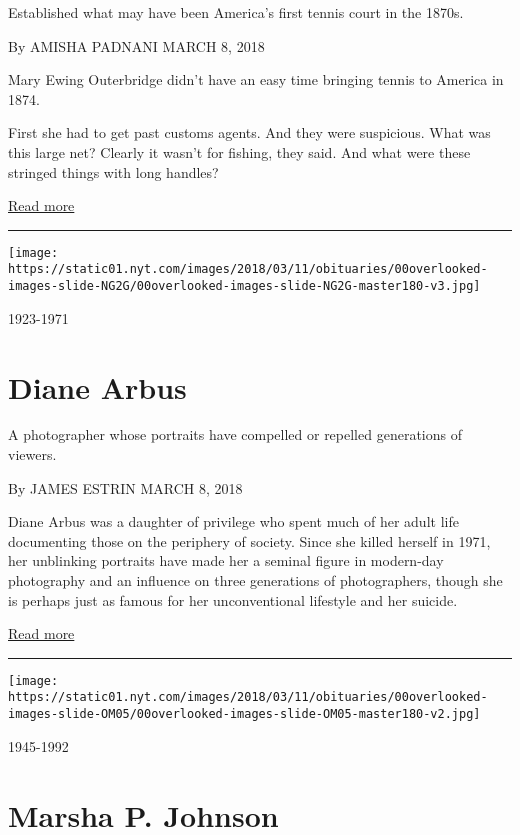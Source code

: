 Established what may have been America's first tennis court in the
1870s.

By AMISHA PADNANI MARCH 8, 2018

Mary Ewing Outerbridge didn't have an easy time bringing tennis to
America in 1874.

First she had to get past customs agents. And they were suspicious. What
was this large net? Clearly it wasn't for fishing, they said. And what
were these stringed things with long handles?

\href{https://www.nytimes.com/interactive/2018/obituaries/overlooked-mary-ewing-outerbridge.html}{Read
more}

\begin{center}\rule{0.5\linewidth}{\linethickness}\end{center}

\texttt{[image: https://static01.nyt.com/images/2018/03/11/obituaries/00overlooked-images-slide-NG2G/00overlooked-images-slide-NG2G-master180-v3.jpg]}

1923-1971

\hypertarget{diane-arbus}{%
\section{Diane Arbus}\label{diane-arbus}}

A photographer whose portraits have compelled or repelled generations of
viewers.

By JAMES ESTRIN MARCH 8, 2018

Diane Arbus was a daughter of privilege who spent much of her adult life
documenting those on the periphery of society. Since she killed herself
in 1971, her unblinking portraits have made her a seminal figure in
modern-day photography and an influence on three generations of
photographers, though she is perhaps just as famous for her
unconventional lifestyle and her suicide.

\href{https://www.nytimes.com/interactive/2018/obituaries/overlooked-diane-arbus.html}{Read
more}

\begin{center}\rule{0.5\linewidth}{\linethickness}\end{center}

\texttt{[image: https://static01.nyt.com/images/2018/03/11/obituaries/00overlooked-images-slide-OM05/00overlooked-images-slide-OM05-master180-v2.jpg]}

1945-1992

\hypertarget{marsha-p-johnson}{%
\section{Marsha P. Johnson}\label{marsha-p-johnson}}

